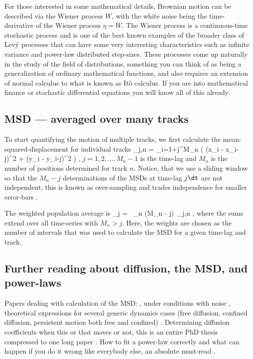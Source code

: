 For those interested in some mathematical details, Brownian motion can be described via the Wiener process $W$, with the white noise being the time-derivative of the Wiener process $\eta = \dot{W}$. 
The Wiener process is a continuous-time stochastic process and is one of the best known examples of the broader class of Lev\'{y} processes that can have some very interesting characteristics such as infinite variance and power-law distributed step-sizes. 
These processes come up naturally in the study of the field of distributions, something you can think of as being a generalization of ordinary mathematical functions, and also requires an extension of normal calculus to what is known as It\^{o} calculus. If you are into mathematical finance or stochastic differential equations you will know all of this already.

\subsection{MSD --- averaged over many tracks}
To start quantifying the motion of multiple tracks, we first calculate the mean-squared-displacement for individual tracks
\be
   \msd_{j,n} =  \sum_{i=1+j}^{M_n} 
   \left(  (x_i - x_{i-j})^2 + (y_i - y_{i-j})^2 \right)    \e,
\ee
$j=1,2,\ldots,M_n -1$ is the time-lag and $M_n$ is the number of positions determined for track $n$.
Notice, that we use a sliding window so that the $M_n-j$ determinations of the MSDs at time-lag $j\dt$ are not independent; this is known as over-sampling and trades independence for smaller error-bars \cite{Wang:2007book}.

The weighted population average is
\be
	\MSD_j = \, \sum_{n} (M_n - j)\, \msd_{j,n} \e,
\ee
where the sums extend over all time-series with $M_n > j$.  Here, the weights are chosen as the number of intervals that was used to calculate the MSD for a given time-lag and track.

\subsection{Further reading about diffusion, the MSD,  and power-laws}
Papers dealing with calculation of the MSD: \cite{Qian:1991}, under conditions with noise \cite{Michalet:2010}, theoretical expressions for several generic dynamics cases (free diffusion, confined diffusion, persistent motion both free and confined) \cite{Norrelykke:2011}.
Determining diffusion coefficients when this or that moves or not, this is an entire PhD thesis compressed to one long paper \cite{Vestergaard:2014}.
How to fit a power-law correctly and what can happen if you do it wrong like everybody else, an absolute must-read \cite{Clauset:2009}.